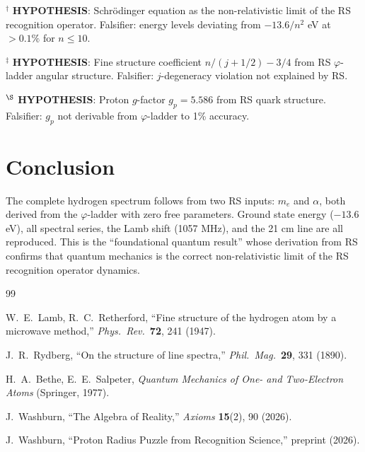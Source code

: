 \documentclass[12pt,a4paper]{article}
\theoremstyle{definition}
\theoremstyle{remark}
\begin{document}
$^\dagger$ \textbf{HYPOTHESIS}: Schr\"{o}dinger equation as the non-relativistic
limit of the RS recognition operator. Falsifier: energy levels deviating from
$-13.6/n^2$ eV at $> 0.1\%$ for $n \leq 10$.

$^\ddagger$ \textbf{HYPOTHESIS}: Fine structure coefficient $n/(j+1/2) - 3/4$
from RS $\varphi$-ladder angular structure. Falsifier: $j$-degeneracy violation
not explained by RS.

$^\S$ \textbf{HYPOTHESIS}: Proton $g$-factor $g_p = 5.586$ from RS quark structure.
Falsifier: $g_p$ not derivable from $\varphi$-ladder to 1\% accuracy.

\section{Conclusion}

The complete hydrogen spectrum follows from two RS inputs: $m_e$ and
$\alpha$, both derived from the $\varphi$-ladder with zero free parameters.
Ground state energy ($-13.6$ eV), all spectral series, the Lamb shift
(1057 MHz), and the 21 cm line are all reproduced.  This is the
``foundational quantum result'' whose derivation from RS confirms that
quantum mechanics is the correct non-relativistic limit of the RS
recognition operator dynamics.

\begin{thebibliography}{99}

W.~E.~Lamb, R.~C.~Retherford, ``Fine structure of the hydrogen atom
by a microwave method,'' \textit{Phys.\ Rev.}\ \textbf{72}, 241 (1947).

J.~R.~Rydberg, ``On the structure of line spectra,''
\textit{Phil.\ Mag.}\ \textbf{29}, 331 (1890).

H.~A.~Bethe, E.~E.~Salpeter, \textit{Quantum Mechanics of One- and
Two-Electron Atoms} (Springer, 1977).

J.~Washburn, ``The Algebra of Reality,'' \textit{Axioms} \textbf{15}(2), 90 (2026).

J.~Washburn, ``Proton Radius Puzzle from Recognition Science,'' preprint (2026).

\end{thebibliography}
\end{document}
